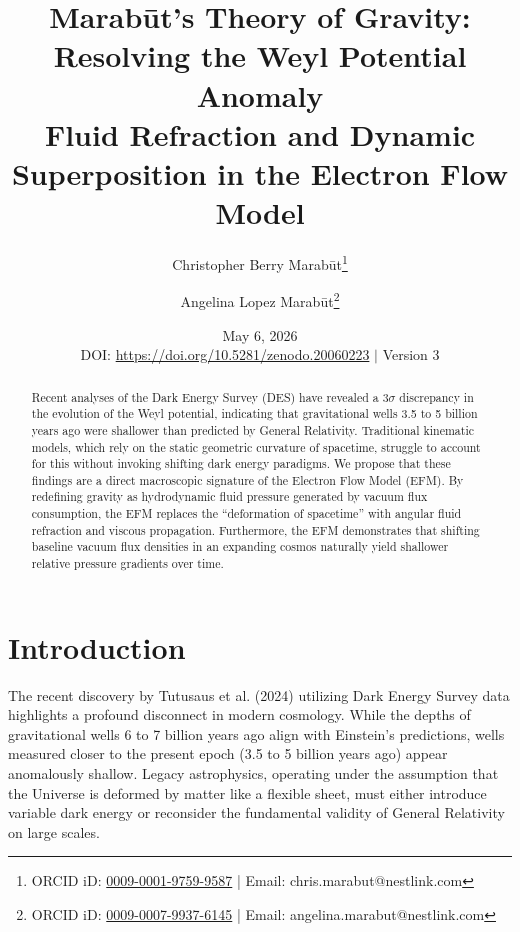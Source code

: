 \documentclass[11pt, a4paper]{article}
\title{\textbf{Marab\={u}t's Theory of Gravity: \\ Resolving the Weyl Potential Anomaly} \\ \large{Fluid Refraction and Dynamic Superposition in the Electron Flow Model}}
\author[1]{Christopher Berry Marab\={u}t\thanks{ORCID iD: \href{https://orcid.org/0009-0001-9759-9587}{0009-0001-9759-9587} | Email: chris.marabut@nestlink.com}}
\author[1]{Angelina Lopez Marab\={u}t\thanks{ORCID iD: \href{https://orcid.org/0009-0007-9937-6145}{0009-0007-9937-6145} | Email: angelina.marabut@nestlink.com}}
\affil[1]{Independent Researchers}
\date{May 6, 2026 \\[1.5em] \small{DOI: \url{https://doi.org/10.5281/zenodo.20060223} $|$ Version 3}}
\begin{document}

\maketitle

\begin{abstract}
Recent analyses of the Dark Energy Survey (DES) have revealed a $3\sigma$ discrepancy in the evolution of the Weyl potential, indicating that gravitational wells 3.5 to 5 billion years ago were shallower than predicted by General Relativity. Traditional kinematic models, which rely on the static geometric curvature of spacetime, struggle to account for this without invoking shifting dark energy paradigms. We propose that these findings are a direct macroscopic signature of the Electron Flow Model (EFM). By redefining gravity as hydrodynamic fluid pressure generated by vacuum flux consumption, the EFM replaces the ``deformation of spacetime'' with angular fluid refraction and viscous propagation. Furthermore, the EFM demonstrates that shifting baseline vacuum flux densities in an expanding cosmos naturally yield shallower relative pressure gradients over time.
\end{abstract}

\section{Introduction}
The recent discovery by Tutusaus et al. (2024) \cite{tutusaus2024} utilizing Dark Energy Survey data highlights a profound disconnect in modern cosmology. While the depths of gravitational wells 6 to 7 billion years ago align with Einstein's predictions, wells measured closer to the present epoch (3.5 to 5 billion years ago) appear anomalously shallow. Legacy astrophysics, operating under the assumption that the Universe is deformed by matter like a flexible sheet, must either introduce variable dark energy or reconsider the fundamental validity of General Relativity on large scales. 
\end{document}
